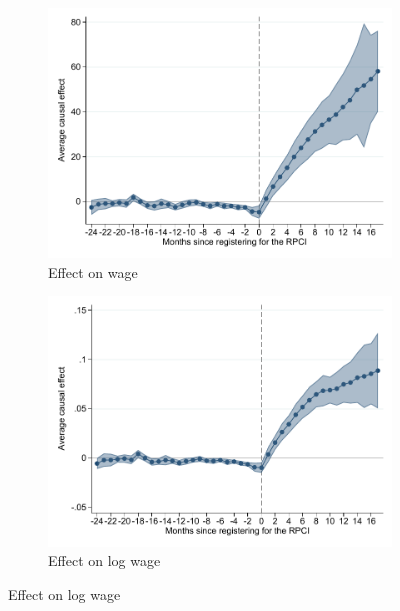 \documentclass[oneside,11pt]{article}
\begin{document}
\clearpage

\begin{figure}[H]
    \caption{Event studies - RPCI effect}
    \label{event_study}
    \begin{center}
    
    \begin{subfigure}{0.49\textwidth}
    \caption{Effect on wage}
    \includegraphics[width=\textwidth]{04_Figures/muestra_10porciento/event_study_sal_cierre_chaisemartin.pdf}
    \end{subfigure}
    \begin{subfigure}{0.49\textwidth}
    \caption{Effect on log wage}
    \includegraphics[width=\textwidth]{04_Figures/muestra_10porciento/event_study_log_sal_cierre_chaisemartin.pdf}
    \end{subfigure}
    

\end{center}
\end{figure}
\end{document}
